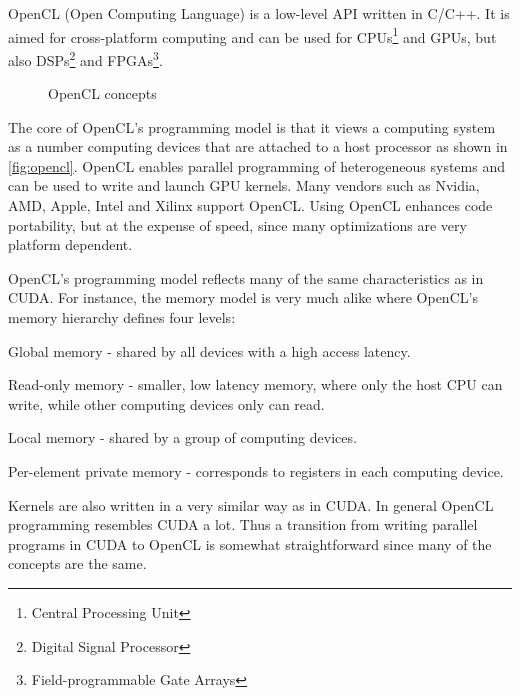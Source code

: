 OpenCL (Open Computing Language) is a low-level API written in C/C++.
It is aimed for cross-platform computing and can be used for CPUs\footnote{Central Processing Unit} and GPUs, but also DSPs\footnote{Digital Signal Processor} and FPGAs\footnote{Field-programmable Gate Arrays}.

\begin{figure}
	\centering
	\caption{OpenCL concepts} 
	\label{fig:opencl}
\end{figure}

\noindent The core of OpenCL's programming model is that it views a computing system as a number computing devices that are attached to a host processor as shown in \autoref{fig:opencl}.
OpenCL enables parallel programming of heterogeneous systems and can be used to write and launch GPU kernels.
Many vendors such as Nvidia, AMD, Apple, Intel and Xilinx support OpenCL.
Using OpenCL enhances code portability, but at the expense of speed, since many optimizations are very platform dependent.

OpenCL's programming model reflects many of the same characteristics as in CUDA.
For instance, the memory model is very much alike where OpenCL's memory hierarchy defines four levels:
\begin{itemizeSmall}
	\item Global memory - shared by all devices with a high access latency.
	\item Read-only memory - smaller, low latency memory, where only the host CPU can write, while other computing devices only can read.
	\item Local memory - shared by a group of computing devices.
	\item Per-element private memory - corresponds to registers in each computing device.
\end{itemizeSmall}
Kernels are also written in a very similar way as in CUDA.
In general OpenCL programming resembles CUDA a lot.
Thus a transition from writing parallel programs in CUDA to OpenCL is somewhat straightforward since many of the concepts are the same.
